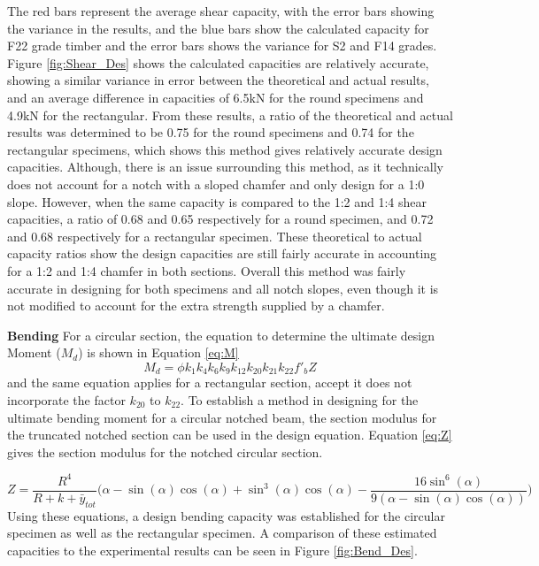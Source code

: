 \documentclass[11pt,a4paper]{article}
\numberwithin{equation}{subsection}
\begin{document}
\noindent
The red bars represent the average shear capacity, with the error bars showing the variance in the results, and the blue bars show the calculated capacity for F22 grade timber and the error bars shows the variance for S2 and F14 grades. Figure \ref{fig:Shear_Des} shows the calculated capacities are relatively accurate, showing a similar variance in error between the theoretical and actual results, and an average difference in capacities of 6.5kN for the round specimens and 4.9kN for the rectangular. From these results, a ratio of the theoretical and actual results was determined to be 0.75 for the round specimens and 0.74 for the rectangular specimens, which shows this method gives relatively accurate design capacities. Although, there is an issue surrounding this method, as it technically does not account for a notch with a sloped chamfer and only design for a 1:0 slope. However, when the same capacity is compared to the 1:2 and 1:4 shear capacities, a ratio of 0.68 and 0.65 respectively for a round specimen, and 0.72 and 0.68 respectively for a rectangular specimen. These theoretical to actual capacity ratios show the design capacities are still fairly accurate in accounting for a 1:2 and 1:4 chamfer in both sections. Overall this method was fairly accurate in designing for both specimens and all notch slopes, even though it is not modified to account for the extra strength supplied by a chamfer. 

\vspace*{\baselineskip}
\noindent
\textbf{Bending}
\noindent
For a circular section, the equation to determine the ultimate design Moment ($M_{d}$) is shown in Equation \ref{eq:M}
\begin{equation}
M_{d} = \phi k_{1} k_{4} k_{6} k_{9} k_{12} k_{20} k_{21} k_{22} f'_{b} Z
\label{eq:M}
\end{equation}
\noindent
and the same equation applies for a rectangular section, accept it does not incorporate the factor $k_{20}$ to $k_{22}$. To establish a method in designing for the ultimate bending moment for a circular notched beam, the section modulus for the truncated notched section can be used in the design equation. Equation \ref{eq:Z} gives the section modulus for the notched circular section. 

	\begin{equation}
	Z = \frac{R^{4}}{R+k+\bar{y}_{tot}}\bigg(\alpha-\sin(\alpha)\cos(\alpha)+\sin^{3}(\alpha)\cos(\alpha)-\frac{16\sin^{6}(\alpha)}{9(\alpha-\sin(\alpha)\cos(\alpha))}\bigg)
	\label{eq:Z}
	\end{equation}
\noindent
Using these equations, a design bending capacity was established for the circular specimen as well as the rectangular specimen. A comparison of these estimated capacities to the experimental results can be seen in Figure \ref{fig:Bend_Des}.
\end{document}
